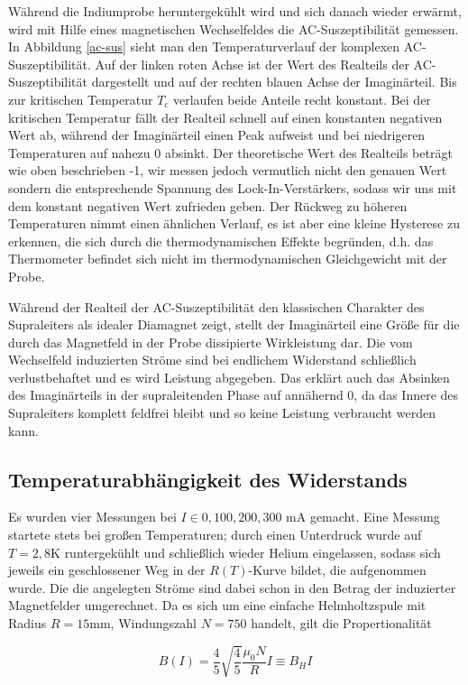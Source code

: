 Während die Indiumprobe heruntergekühlt wird und sich danach wieder erwärmt, wird mit Hilfe eines magnetischen Wechselfeldes die AC-Suszeptibilität gemessen. In Abbildung \ref{ac-sus} sieht man den Temperaturverlauf der komplexen AC-Suszeptibilität. Auf der linken roten Achse ist der Wert des Realteils der AC-Suszeptibilität dargestellt und auf der rechten blauen Achse der Imaginärteil. Bis zur kritischen Temperatur $T_c$ verlaufen beide Anteile recht konstant. Bei der kritischen Temperatur fällt der Realteil schnell auf einen konstanten negativen Wert ab, während der Imaginärteil einen Peak aufweist und bei niedrigeren Temperaturen auf nahezu 0 absinkt. Der theoretische Wert des Realteils beträgt wie oben beschrieben -1, wir messen jedoch vermutlich nicht den genauen Wert sondern die entsprechende Spannung des Lock-In-Verstärkers, sodass wir uns mit dem konstant negativen Wert zufrieden geben. Der Rückweg zu höheren Temperaturen nimmt einen ähnlichen Verlauf, es ist aber eine kleine Hysterese zu erkennen, die sich durch die thermodynamischen Effekte begründen, d.h. das Thermometer befindet sich nicht im thermodynamischen Gleichgewicht mit der Probe.

Während der Realteil der AC-Suszeptibilität den klassischen Charakter des Supraleiters als idealer Diamagnet zeigt, stellt der Imaginärteil eine Größe für die durch das Magnetfeld in der Probe dissipierte Wirkleistung dar. Die vom Wechselfeld induzierten Ströme sind bei endlichem Widerstand schließlich verlustbehaftet und es wird Leistung abgegeben. Das erklärt auch das Absinken des Imaginärteils in der supraleitenden Phase auf annähernd 0, da das Innere des Supraleiters komplett feldfrei bleibt und so keine Leistung verbraucht werden kann.

\subsection{Temperaturabhängigkeit des Widerstands}
Es wurden vier Messungen bei $I \in {0,100,200,300}$ mA gemacht. Eine Messung startete stets bei großen Temperaturen; durch einen Unterdruck wurde auf $T=2,8$K runtergekühlt und schließlich wieder Helium eingelassen, sodass sich jeweils ein geschlossener Weg in der $R(T)$-Kurve bildet, die aufgenommen wurde. Die die angelegten Ströme sind dabei schon in den Betrag der induzierter Magnetfelder umgerechnet. Da es sich um eine einfache Helmholtzspule mit Radius $R=15$mm, Windungszahl $N=750$ handelt, gilt die Propertionalität

\begin{equation}
B(I) = \frac{4}{5}\sqrt{\frac{4}{5}} \frac{\mu_0 N}{R} I \equiv B_H I
\end{equation}

